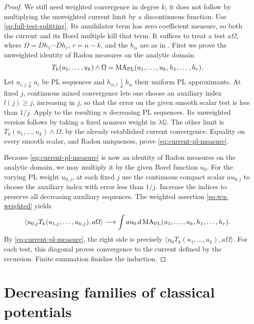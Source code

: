 \documentclass[11pt,reqno]{amsart}
\theoremstyle{definition}
\theoremstyle{remark}
\numberwithin{equation}{section}
\newcommand{\MA}{\operatorname{MA}}
\begin{document}
\begin{proof}
We still need weighted convergence in degree $k$; it does not follow
by multiplying the unweighted current limit by a discontinuous
function. Use \eqref{eq:full-test-splitting}. Its annihilator term
has zero coefficient measure, so both the current and its Borel
multiple kill that term. It suffices to treat a test \(a\Omega\), where
\(\Omega=Dh_1\cdots Dh_r\), \(r=n-k\), and the \(h_\alpha\)
are as in . First we prove the unweighted
identity of Radon measures on the analytic domain
\begin{equation}\label{eq:current-pl-measure}
 T_k(u_1,\ldots,u_k)\wedge\Omega
 =\MA_{\rm PL}(u_1,\ldots,u_k,h_1,\ldots,h_r).
\end{equation}
Let \(u_{i,j}\downarrow u_i\) be PL sequences and
\(h_{\alpha,l}\downarrow h_\alpha\) their uniform PL
approximants. At fixed \(j\), continuous mixed convergence lets
one choose an auxiliary index \(l(j)\geq j\), increasing in
\(j\), so that the error on the given smooth scalar test is
less than \(1/j\). Apply  to the resulting
\(n\) decreasing PL sequences. Its unweighted version
follows by taking a fixed nonzero weight in \(\lambda\mathbb Q\).
The other limit is
\(T_k(u_1,\ldots,u_k)\wedge\Omega\), by the already established
current convergence. Equality on every smooth scalar, and
Radon uniqueness, prove \eqref{eq:current-pl-measure}.

Because \eqref{eq:current-pl-measure} is now an identity of Radon
measures on the analytic domain, we may multiply it by the given
Borel function $u_0$. For the varying PL weight $u_{0,j}$, at
each fixed \(j\) use the continuous compact scalar
\(a u_{0,j}\) to choose the auxiliary index with error less
than \(1/j\). Increase the indices to preserve all
decreasing auxiliary sequences. The weighted assertion
\eqref{eq:wu-weighted} yields
\[
 \langle u_{0,j}T_k(u_{1,j},\ldots,u_{k,j}),a\Omega\rangle
 \longrightarrow
 \int a u_0\,d\MA_{\rm PL}(u_1,\ldots,u_k,h_1,\ldots,h_r).
\]
By \eqref{eq:current-pl-measure}, the right side is precisely
\(\langle u_0T_k(u_1,\ldots,u_k),a\Omega\rangle\).
For each test, this diagonal proves convergence to the current
defined by the recursion. Finite summation finishes
the induction.
\end{proof}

\section{Decreasing families of classical potentials}\label{sec:arbitrary-columns}
\end{document}
